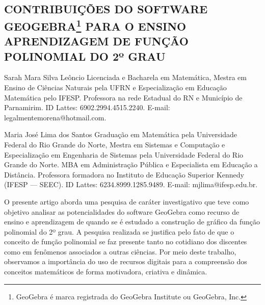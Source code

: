 \begin{refsection}
    \renewcommand{\thefigure}{\arabic{figure}}
    \renewcommand{\thetable}{\arabic{table}}
    \renewcommand{\thequadro}{\arabic{quadro}}

    \chapter[Contribuições do Software GeoGebra para o ensino aprendizagem de função polinomial do 2º grau]{CONTRIBUIÇÕES DO SOFTWARE GEOGEBRA\footnote{GeoGebra é marca registrada do GeoGebra Institute ou GeoGebra, Inc.} PARA O ENSINO APRENDIZAGEM DE FUNÇÃO POLINOMIAL DO 2º GRAU}
    \label{chap:contrib-geogebra}
    
    \articleAuthor
    {Sarah Mara Silva Leôncio}
    {Licenciada e Bacharela em Matemática, Mestra em Ensino de Ciências Naturais pela UFRN e Especialização em Educação Matemática pelo IFESP. Professora na rede Estadual do RN e Município de Parnamirim. ID Lattes: 6902.2994.4515.2240. E-mail: legalmentemorena@hotmail.com.}

    \articleAuthor
    {Maria José Lima dos Santos}
    {Graduação em Matemática pela Universidade Federal do Rio Grande do Norte, Mestra em Sistemas e Computação e Especialização em Engenharia de Sistemas pela Universidade Federal do Rio Grande do Norte. MBA em Administração Pública e Especialista em Educação a Distância. Professora formadora no Instituto de Educação Superior Kennedy (IFESP --- SEEC). ID Lattes: 6234.8999.1285.9489. E-mail: mjlima@ifesp.edu.br.}
    
    \begin{galoResumo}
        O presente artigo aborda uma pesquisa de caráter investigativo que teve como objetivo analisar as potencialidades do software GeoGebra como recurso de ensino e aprendizagem de quando se é estudado a construção de gráfico da função polinomial do 2º grau. A pesquisa realizada se justifica pelo fato de que o conceito de função polinomial se faz presente tanto no cotidiano dos discentes como em fenômenos associados a outras ciências. Por meio deste trabalho, observamos a importância do uso de recursos digitais para a compreensão dos conceitos matemáticos de forma motivadora, criativa e dinâmica.
    \end{galoResumo}
    

\end{refsection}
